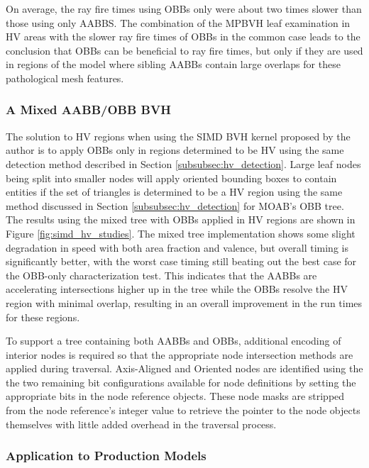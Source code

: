 On average, the ray fire times using OBBs only were about two times slower
than those using only AABBS. The combination of the MPBVH leaf
examination in HV areas with the slower ray fire times of OBBs in the
common case leads to the conclusion that OBBs can be beneficial to ray fire
times, but only if they are used in regions of the model where sibling
AABBs contain large overlaps for these pathological mesh features. 

\subsubsection{A Mixed AABB/OBB BVH}

The solution to HV regions when using the SIMD BVH
kernel proposed by the author is to apply OBBs only in regions determined to be
HV using the same detection method described in Section
\ref{subsubsec:hv_detection}. Large leaf nodes being split into smaller nodes
will apply oriented bounding boxes to contain entities if the set of triangles
is determined to be a HV region using the same method discussed in
Section \ref{subsubsec:hv_detection} for MOAB's OBB tree. The results using the mixed tree with
OBBs applied in HV regions are shown in Figure \ref{fig:simd_hv_studies}. The
mixed tree implementation shows some slight degradation in speed with both area
fraction and valence, but overall timing is significantly better, with the worst
case timing still beating out the best case for the OBB-only characterization
test. This indicates that the AABBs are accelerating intersections higher up in
the tree while the OBBs resolve the HV region with minimal overlap,
resulting in an overall improvement in the run times for these regions.

To support a tree containing both AABBs and OBBs, additional encoding of
interior nodes is required so that the appropriate node intersection methods are
applied during traversal. Axis-Aligned and Oriented nodes are identified using
the the two remaining bit configurations available for node definitions by
setting the appropriate bits in the node reference objects. These node masks are
stripped from the node reference's integer value to retrieve the pointer to the
node objects themselves with little added overhead in the traversal process.

\subsubsection{Application to Production Models}

